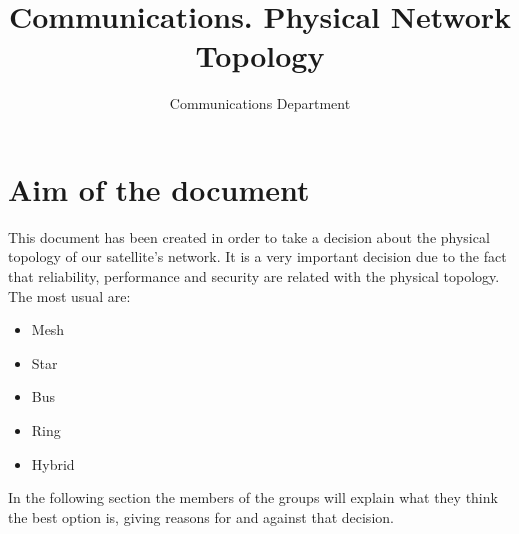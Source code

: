 \documentclass[12pt,a4paper]{article}
\author{Communications Department}
\title{Communications. Physical Network Topology}
\begin{document}
\section{Aim of the document}
This document has been created in order to take a decision about the physical topology of our satellite's network. It is a very important decision due to the fact that reliability, performance and security are related with the physical topology. The most usual are: 
\begin{itemize}
\item Mesh
\item Star
\item Bus
\item Ring
\item Hybrid
\end{itemize}
In the following section the members of the groups will explain what they think the best option is, giving reasons for and against that decision. 
	
	
	
	
	
	
	{}
	
	
	
\end{document}
